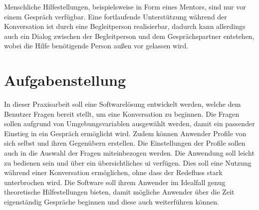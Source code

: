 Menschliche Hilfestellungen, beispielsweise in Form eines Mentors, sind nur vor einem Gespräch verfügbar. Eine fortlaufende Unterstützung während der Konversation ist durch eine Begleitperson realisierbar, dadurch kann allerdings auch ein Dialog zwischen der Begleitperson und dem Gesprächspartner entstehen, wobei die Hilfe benötigende Person außen vor gelassen wird.



\section{Aufgabenstellung}
\label{sec:aufgabenstellung}

In dieser Praxisarbeit soll eine Softwarelösung entwickelt werden, welche dem Benutzer Fragen bereit stellt, um eine Konversation zu beginnen. \newline
Die Fragen sollen aufgrund von Umgebungsvariablen ausgewählt werden, damit ein passender Einstieg in ein Gespräch ermöglicht wird. Zudem können Anwender Profile von sich selbst und ihren Gegenübern erstellen. Die Einstellungen der Profile sollen auch in die Auswahl der Fragen miteinbezogen werden. \newline
Die Anwendung soll leicht zu bedienen sein und über ein übersichtliches \gls{ui} verfügen. Dies soll eine Nutzung während einer Konversation ermöglichen, ohne dass der Redefluss stark unterbrochen wird.\newline
Die Software soll ihrem Anwender im Idealfall genug theoretische Hilfestellungen bieten, damit mögliche Anwender über die Zeit eigenständig Gespräche beginnen und diese auch weiterführen können.

